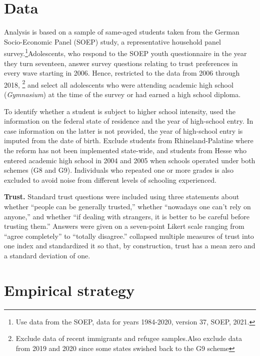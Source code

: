 \documentclass[11pt, a4paper, leqno]{article}
\begin{document}
\section{Data\label{sec:data}}
Analysis is based on a sample of same-aged students taken from the German Socio-Economic Panel (SOEP) study, a 
representative household panel survey.\footnote{Use data from the SOEP, data for years 1984-2020, version 37,
SOEP, 2021.}Adolescents, who respond to the SOEP youth questionnaire in the year they turn seventeen, answer survey 
questions relating to trust preferences in every wave starting in 2006. Hence, restricted to the data from 2006 through 2018, 
\footnote{Exclude data of recent immigrants and refugee samples.Also exclude data from 2019 and 2020 since some 
states swished back to the G9 scheme} and select all adolescents who were attending academic high school (\textit{Gymnasium}) 
at the time of the survey or had earned a high school diploma.\par To identify whether a student is subject to higher school intensity, 
used the information on the federal state of residence and the year of high-school entry. In case information on the latter is not provided, 
the year of high-school entry is imputed from the date of birth. Exclude students from Rhineland-Palatine where the reform has not been implemented 
state-wide, and students from Hesse who entered academic high school in 2004 and 2005 when schools operated under both schemes (G8 and G9). Individuals who
repeated one or more grades is also excluded to avoid noise from different levels of schooling experienced.\par \textbf{Trust.} Standard trust 
questions were included using three statements about whether “people can be generally trusted,” whether “nowadays one can’t rely on anyone,” 
and whether “if dealing with strangers, it is better to be careful before trusting them.” Answers were given on a seven-point Likert scale ranging 
from “agree completely” to “totally disagree.” collapsed multiple measures of trust into one index and standardized it so that, by construction, trust 
has a mean zero and a standard deviation of one.  

\section{Empirical strategy\label{sec:strategy}}
\end{document}
